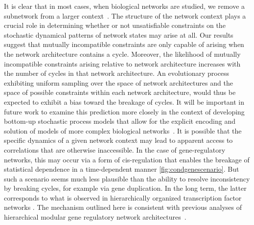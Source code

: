 It is clear that in most cases, when biological networks are studied, we remove a subnetwork from a larger context~\cite{Alon2007}. The structure of the network context plays a crucial role in determining whether or not unsatisfiable constraints on the stochastic dynamical patterns of network states may arise at all. Our results suggest that mutually incompatible constraints are only capable of arising when the network architecture contains a cycle. Moreover, the likelihood of mutually incompatible constraints arising relative to network architecture increases with the number of cycles in that network architecture. An evolutionary process exhibiting uniform sampling over the space of network architectures and the space of possible constraints within each network architecture, would thus be expected to exhibit a bias toward the breakage of cycles. It will be important in future work to examine this prediction more closely in the context of developing bottom-up stochastic process models that allow for the explicit encoding and solution of models of more complex biological networks~\cite{Walczak2009,Mugler2009}. It is possible that the specific dynamics of a given network context may lead to apparent access to correlations that are otherwise inaccessible. In the case of gene-regulatory networks, this may occur via a form of cis-regulation that enables the breakage of statistical dependence in a time-dependent manner \ref{fig:condgenescenario}. But such a scenario seems much less plausible than the ability to resolve inconsistency by breaking cycles, for example via gene duplication. In the long term, the latter corresponds to what is observed in hierarchically organized transcription factor networks \cite{Jothi2009,Bhardwaj2010,Chalancon2012,Colm}. The mechanism outlined here is consistent with previous analyses of hierarchical modular gene regulatory network architectures~\cite{Ravasz2002,Segre2005,Wagner2007,Erwin2009,Jothi2009,Bhardwaj2010,Colm}.

